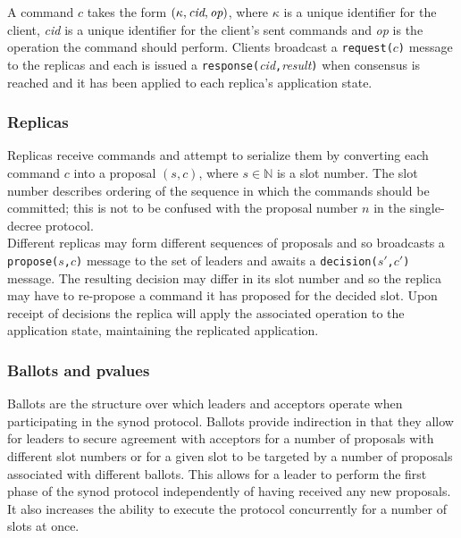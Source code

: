 A command $c$ takes the form $\left( \kappa, \mathrm{\emph{cid}}, \mathrm{\emph{op}} \right)$, where $\kappa$ is a unique identifier for the client, \emph{cid} is a unique identifier for the client's sent commands and \emph{op} is the operation the command should perform. Clients broadcast a \texttt{request($c$)} message to the replicas and each is issued a \texttt{response(}\emph{cid}\texttt{,}\emph{result}\texttt{)} when consensus is reached and it has been applied to each replica's application state.

\subsubsection{Replicas}

Replicas receive commands and attempt to serialize them by converting each command $c$ into a proposal $\left(s,c\right)$, where $s \in \mathbb{N}$ is a slot number. The slot number describes ordering of the sequence in which the commands should be committed; this is not to be confused with the proposal number $n$ in the single-decree protocol. \\

Different replicas may form different sequences of proposals and so broadcasts a \texttt{propose($s$,$c$)} message to the set of leaders and awaits a \texttt{decision($s'$,$c'$)} message. The resulting decision may differ in its slot number and so the replica may have to re-propose a command it has proposed for the decided slot. Upon receipt of decisions the replica will apply the associated operation to the application state, maintaining the replicated application.

\subsubsection{Ballots and pvalues}

Ballots are the structure over which leaders and acceptors operate when participating in the synod protocol. Ballots provide indirection in that they allow for leaders to secure agreement with acceptors for a number of proposals with different slot numbers or for a given slot to be targeted by a number of proposals associated with different ballots. This allows for a leader to perform the first phase of the synod protocol independently of having received any new proposals. It also increases the ability to execute the protocol concurrently for a number of slots at once. \\

